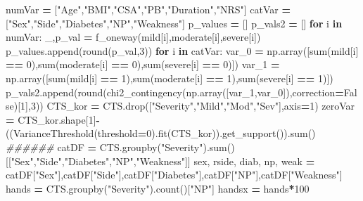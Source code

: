 \documentclass[12pt,twoside]{deuthesis}
\newenvironment{Shaded}{\begin{snugshade}}{\end{snugshade}}
\newcommand{\BuiltInTok}[1]{#1}
\newcommand{\CommentTok}[1]{\textcolor[rgb]{0.56,0.35,0.01}{\textit{#1}}}
\newcommand{\ControlFlowTok}[1]{\textcolor[rgb]{0.13,0.29,0.53}{\textbf{#1}}}
\newcommand{\DecValTok}[1]{\textcolor[rgb]{0.00,0.00,0.81}{#1}}
\newcommand{\KeywordTok}[1]{\textcolor[rgb]{0.13,0.29,0.53}{\textbf{#1}}}
\newcommand{\NormalTok}[1]{#1}
\newcommand{\OperatorTok}[1]{\textcolor[rgb]{0.81,0.36,0.00}{\textbf{#1}}}
\newcommand{\StringTok}[1]{\textcolor[rgb]{0.31,0.60,0.02}{#1}}
\newcommand{\VariableTok}[1]{\textcolor[rgb]{0.00,0.00,0.00}{#1}}
\begin{document}
\begin{Shaded}
\begin{Highlighting}[]
\NormalTok{numVar }\OperatorTok{=}\NormalTok{ [}\StringTok{"Age"}\NormalTok{,}\StringTok{"BMI"}\NormalTok{,}\StringTok{"CSA"}\NormalTok{,}\StringTok{"PB"}\NormalTok{,}\StringTok{"Duration"}\NormalTok{,}\StringTok{"NRS"}\NormalTok{]}
\NormalTok{catVar }\OperatorTok{=}\NormalTok{ [}\StringTok{"Sex"}\NormalTok{,}\StringTok{"Side"}\NormalTok{,}\StringTok{"Diabetes"}\NormalTok{,}\StringTok{"NP"}\NormalTok{,}\StringTok{"Weakness"}\NormalTok{]}
\NormalTok{p\_values }\OperatorTok{=}\NormalTok{ []}
\NormalTok{p\_vals2 }\OperatorTok{=}\NormalTok{ []}
\ControlFlowTok{for}\NormalTok{ i }\KeywordTok{in}\NormalTok{ numVar:}
\NormalTok{    \_,p\_val }\OperatorTok{=}\NormalTok{ f\_oneway(mild[i],moderate[i],severe[i])}
\NormalTok{    p\_values.append(}\BuiltInTok{round}\NormalTok{(p\_val,}\DecValTok{3}\NormalTok{))}
\ControlFlowTok{for}\NormalTok{ i }\KeywordTok{in}\NormalTok{ catVar:}
\NormalTok{    var\_0 }\OperatorTok{=}\NormalTok{ np.array([}\BuiltInTok{sum}\NormalTok{(mild[i] }\OperatorTok{==} \DecValTok{0}\NormalTok{),}\BuiltInTok{sum}\NormalTok{(moderate[i] }\OperatorTok{==} \DecValTok{0}\NormalTok{),}\BuiltInTok{sum}\NormalTok{(severe[i] }\OperatorTok{==} \DecValTok{0}\NormalTok{)])}
\NormalTok{    var\_1 }\OperatorTok{=}\NormalTok{ np.array([}\BuiltInTok{sum}\NormalTok{(mild[i] }\OperatorTok{==} \DecValTok{1}\NormalTok{),}\BuiltInTok{sum}\NormalTok{(moderate[i] }\OperatorTok{==} \DecValTok{1}\NormalTok{),}\BuiltInTok{sum}\NormalTok{(severe[i] }\OperatorTok{==} \DecValTok{1}\NormalTok{)])}
\NormalTok{    p\_vals2.append(}\BuiltInTok{round}\NormalTok{(chi2\_contingency(np.array([var\_1,var\_0]),correction}\OperatorTok{=}\VariableTok{False}\NormalTok{)[}\DecValTok{1}\NormalTok{],}\DecValTok{3}\NormalTok{))}
\NormalTok{CTS\_kor }\OperatorTok{=}\NormalTok{ CTS.drop([}\StringTok{"Severity"}\NormalTok{,}\StringTok{"Mild"}\NormalTok{,}\StringTok{"Mod"}\NormalTok{,}\StringTok{"Sev"}\NormalTok{],axis}\OperatorTok{=}\DecValTok{1}\NormalTok{)}
\NormalTok{zeroVar }\OperatorTok{=}\NormalTok{ CTS\_kor.shape[}\DecValTok{1}\NormalTok{]}\OperatorTok{{-}}\NormalTok{((VarianceThreshold(threshold}\OperatorTok{=}\DecValTok{0}\NormalTok{).fit(CTS\_kor)).get\_support()).}\BuiltInTok{sum}\NormalTok{()    }
\CommentTok{\#\#\#\#\#\#}
\NormalTok{catDF }\OperatorTok{=}\NormalTok{ CTS.groupby(}\StringTok{"Severity"}\NormalTok{).}\BuiltInTok{sum}\NormalTok{()[[}\StringTok{"Sex"}\NormalTok{,}\StringTok{"Side"}\NormalTok{,}\StringTok{"Diabetes"}\NormalTok{,}\StringTok{"NP"}\NormalTok{,}\StringTok{"Weakness"}\NormalTok{]]}
\NormalTok{sex, rside, diab, np, weak }\OperatorTok{=}\NormalTok{ catDF[}\StringTok{"Sex"}\NormalTok{],catDF[}\StringTok{"Side"}\NormalTok{],catDF[}\StringTok{"Diabetes"}\NormalTok{],catDF[}\StringTok{"NP"}\NormalTok{],catDF[}\StringTok{"Weakness"}\NormalTok{]}
\NormalTok{hands }\OperatorTok{=}\NormalTok{ CTS.groupby(}\StringTok{"Severity"}\NormalTok{).count()[}\StringTok{"NP"}\NormalTok{]}
\NormalTok{handsx }\OperatorTok{=}\NormalTok{ hands}\OperatorTok{*}\DecValTok{100}
\end{Highlighting}
\end{Shaded}
\end{document}

